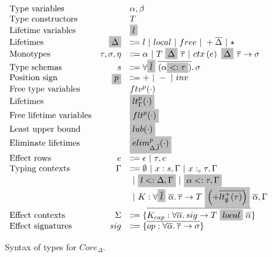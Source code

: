 \documentclass[acmsmall,review,screen]{acmart}
\newcommand{\graybox}[1]{\colorbox{lightgray}{$\displaystyle #1$}}
\newcommand{\vor}{~|~}
\newcommand{\ap}{~}
\newcommand{\ctx}[1]{ctx\left(#1\right)~}
\begin{document}
\begin{figure}
    \[
        \begin{array}{lrl}
            \text{Type variables} && \alpha, \beta \\
            \text{Type constructors} && T \\
            \text{Lifetime variables} && \graybox{l} \\
            \text{Lifetimes} & \graybox{\Delta} &\Coloneqq l \vor local \vor free \vor +\overline{\Delta} \vor \star \\
            \text{Monotypes} & \tau, \sigma, \eta &\Coloneqq \alpha \vor T \ap \graybox{\Delta} \ap \overline{\tau} \vor \ctx{e} \graybox{\Delta}~\overline{\tau} \to \sigma \\
            \text{Type schemas} & s &\Coloneqq \forall \graybox{\overline{l}}~\overline{(\alpha \graybox{<: \tau})}\ldotp \sigma \\
            \text{Position sign} & \graybox{p} & \Coloneqq + \vor - \vor inv \\
            \text{Free type variables} & & ftv^p(\cdot) \\
            \text{Lifetimes} & & \graybox{lt_\Gamma^p(\cdot)} \\
            \text{Free lifetime variables} & & \graybox{flt^p(\cdot)} \\
            \text{Least upper bound} & & \graybox{lub(\cdot)} \\
            \text{Eliminate lifetimes} & & \graybox{elim^p_{\Delta, \overline{l}}(\cdot)} \\
            \text{Effect rows} & e &\Coloneqq \epsilon\vor \tau, e \\
            \text{Typing contexts} & \Gamma &\Coloneqq \emptyset \vor x : s, \Gamma \vor x :_c \tau, \Gamma \\
            & & \vor \graybox{l <: \Delta, \Gamma} \vor \graybox{\alpha <: \tau, \Gamma} \\
            & &\vor K : \forall\graybox{\overline{l}}\ \overline{\alpha}\ldotp \overline{\tau}\to T \ap\graybox{\left(+\overline{lt_\emptyset^+(\tau)}\right)}\ap \overline{\alpha}, \Gamma \\
            \text{Effect contexts} & \Sigma &\Coloneqq \{\overline{K_{cap} : \forall\overline{\alpha}\ldotp sig\to T\ap \graybox{local} \ap\overline{\alpha}}\} \\
            \text{Effect signatures} & sig &\Coloneqq \{\overline{op : \forall\overline{\alpha}\ldotp\overline{\tau}\to\sigma}\}
        \end{array}
    \]
    \caption{Syntax of types for $Core_\Delta$.}
    \label{fig:core-delta-syntax}
\end{figure}
\end{document}
